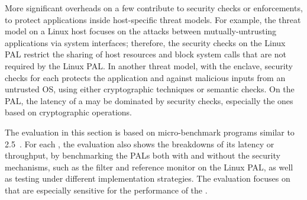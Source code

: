 More significant overheads
on a few \hostapis{} contribute to security checks or enforcements,
to protect applications
inside host-specific threat models.
For example, the threat model on a Linux host
focuses on the attacks between mutually-untrusting applications via system interfaces;
therefore,
the security checks on the Linux PAL
restrict the sharing of host resources and block system calls that are not required by the Linux PAL.
In another threat model, with the \sgx{} enclave, 
security checks for each \hostapi{}
protects the application and \libos{} against malicious inputs from an untrusted OS,
using either cryptographic techniques or semantic checks.
On the \sgx{} PAL, the latency of a \hostapi{} may be dominated
by security checks,
especially the ones based on cryptographic operations.


The evaluation in this section is based on micro-benchmark programs similar to \lmbench{} 2.5~\cite{McVoy:lmbench}.
For each \hostapis{}, the evaluation also shows the breakdowns
of its latency or throughput,
by benchmarking the PALs both with and without the security mechanisms, such as the \seccomp{} filter and reference monitor on the Linux PAL,
as well as testing under different
implementation strategies.
The evaluation focuses on \hostapis{} that are especially sensitive for the performance of the \graphene{} \libos{}.




















